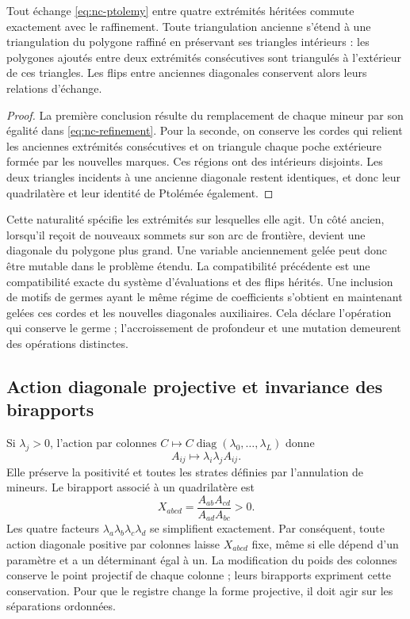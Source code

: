 \begin{proposition}
\label{prop:nc-inherited}
Tout échange \eqref{eq:nc-ptolemy} entre quatre extrémités héritées commute exactement avec le raffinement. Toute triangulation ancienne s'étend à une triangulation du polygone raffiné en préservant ses triangles intérieurs : les polygones ajoutés entre deux extrémités consécutives sont triangulés à l'extérieur de ces triangles. Les flips entre anciennes diagonales conservent alors leurs relations d'échange.
\end{proposition}
\begin{proof}
La première conclusion résulte du remplacement de chaque mineur par son égalité dans
\eqref{eq:nc-refinement}. Pour la seconde, on conserve les cordes qui
relient les anciennes extrémités consécutives et on triangule chaque poche extérieure
formée par les nouvelles marques. Ces régions ont des intérieurs disjoints.
Les deux triangles incidents à une ancienne diagonale restent identiques,
et donc leur quadrilatère et leur identité de Ptolémée également.
\end{proof}

Cette naturalité spécifie les extrémités sur lesquelles elle agit. Un côté
ancien, lorsqu’il reçoit de nouveaux sommets sur son arc de frontière, devient une
diagonale du polygone plus grand. Une variable anciennement gelée
peut donc être mutable dans le problème étendu. La compatibilité précédente est
une compatibilité exacte du système d’évaluations et des flips
hérités. Une inclusion de motifs de germes ayant le même régime de
coefficients s’obtient en maintenant gelées ces cordes et les nouvelles
diagonales auxiliaires. Cela déclare l’opération qui conserve le germe ;
l’accroissement de profondeur et une mutation demeurent des opérations
distinctes.

\subsection{Action diagonale projective et invariance des birapports}

Si \(\lambda_j>0\), l'action par colonnes \(C\mapsto C\operatorname{diag}(\lambda_0,\ldots,\lambda_L)\) donne
\[
 A_{ij}\longmapsto\lambda_i\lambda_j A_{ij}.
\]
Elle préserve la positivité et toutes les strates définies par l’annulation de
mineurs. Le birapport associé à un quadrilatère est
\begin{equation}
 X_{abcd}=\frac{A_{ab}A_{cd}}{A_{ad}A_{bc}}>0.
 \label{eq:nc-crossratio}
\end{equation}
Les quatre facteurs \(\lambda_a\lambda_b\lambda_c\lambda_d\) se simplifient exactement. Par conséquent, toute action diagonale positive par colonnes laisse \(X_{abcd}\) fixe, même si elle dépend d'un paramètre et a un déterminant égal à un. La modification du poids des colonnes conserve le point projectif de chaque colonne ; leurs birapports expriment cette conservation. Pour que le registre change la forme projective, il doit agir sur les séparations ordonnées.

